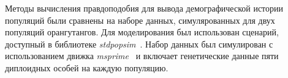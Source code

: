 Методы вычисления правдоподобия для вывода демографической истории популяций были сравнены на наборе данных, симулярованных для двух популяций орангутангов.
Для моделирования был использован сценарий, доступный в библиотеке \textit{stdpopsim}~\cite{adrion2020community}.
Набор данных был симулирован с использованием движка \textit{msprime}~\cite{kelleher2016efficient} и включает генетические данные пяти диплоидных особей на каждую популяцию.






